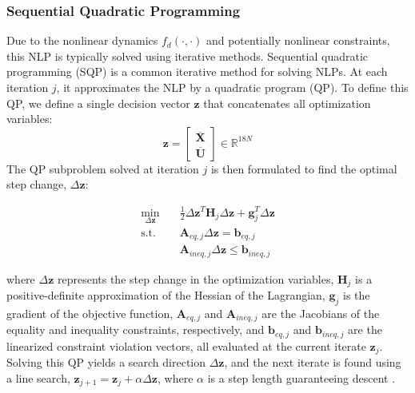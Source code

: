 
\subsubsection{Sequential Quadratic Programming}

Due to the nonlinear dynamics $f_d(\cdot,\cdot)$ and potentially nonlinear constraints, this NLP is typically solved using iterative methods. Sequential quadratic programming (SQP) is a common iterative method for solving NLPs. At each iteration $j$, it approximates the NLP by a quadratic program (QP). To define this QP, we define a single decision vector $\boldsymbol{z}$ that concatenates all optimization variables:
\[
\boldsymbol{z} = \begin{bmatrix} \overline{\mathbf{X}} \\ \overline{\mathbf{U}} \end{bmatrix} \in \mathbb{R}^{18N}
\]
The QP subproblem solved at iteration $j$ is then formulated to find the optimal step change, $\Delta\boldsymbol{z}$:

\begin{equation}
\begin{aligned}
\min_{\Delta\boldsymbol{z}} \quad & \frac{1}{2}\Delta\boldsymbol{z}^T \boldsymbol{H}_j \Delta\boldsymbol{z} + \boldsymbol{g}_j^T \Delta\boldsymbol{z} \\
\text{s.t.} \quad & \boldsymbol{A}_{eq,j} \Delta\boldsymbol{z} = \boldsymbol{b}_{eq,j} \\
& \boldsymbol{A}_{ineq,j} \Delta\boldsymbol{z} \leq \boldsymbol{b}_{ineq,j}
\end{aligned}
\end{equation}

where $\Delta\boldsymbol{z}$ represents the step change in the optimization variables, $\boldsymbol{H}_j$ is a positive-definite approximation of the Hessian of the Lagrangian, $\boldsymbol{g}_j$ is the gradient of the objective function, $\boldsymbol{A}_{eq,j}$ and $\boldsymbol{A}_{ineq,j}$ are the Jacobians of the equality and inequality constraints, respectively, and $\boldsymbol{b}_{eq,j}$ and $\boldsymbol{b}_{ineq,j}$ are the linearized constraint violation vectors, all evaluated at the current iterate $\boldsymbol{z}_j$. Solving this QP yields a search direction $\Delta\boldsymbol{z}$, and the next iterate is found using a line search,  $\boldsymbol{z}_{j+1} = \boldsymbol{z}_j + \alpha \Delta\boldsymbol{z}$, where $\alpha$ is a step length guaranteeing descent \cite{nocedal1999numerical}.


